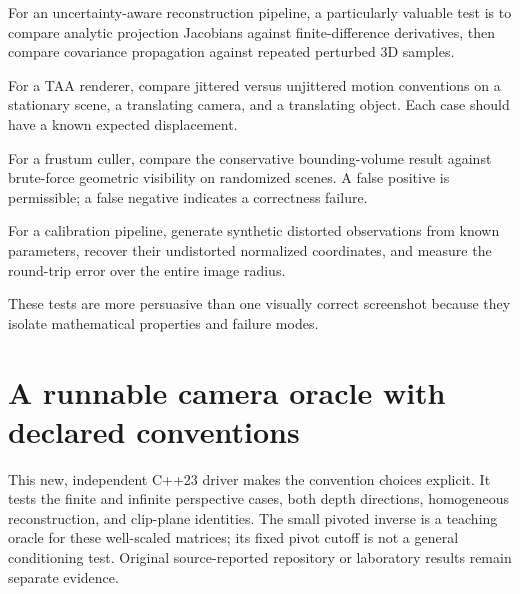 For an uncertainty-aware reconstruction pipeline, a particularly valuable test is to compare analytic projection Jacobians against finite-difference derivatives, then compare covariance propagation against repeated perturbed 3D samples.

For a TAA renderer, compare jittered versus unjittered motion conventions on a stationary scene, a translating camera, and a translating object. Each case should have a known expected displacement.

For a frustum culler, compare the conservative bounding-volume result against brute-force geometric visibility on randomized scenes. A false positive is permissible; a false negative indicates a correctness failure.

For a calibration pipeline, generate synthetic distorted observations from known parameters, recover their undistorted normalized coordinates, and measure the round-trip error over the entire image radius.

These tests are more persuasive than one visually correct screenshot because they isolate mathematical properties and failure modes.

\section{A runnable camera oracle with declared conventions}\label{02-foundations-ii-ch037-a-runnable-camera-oracle-with-declared-conventions}

\hypertarget{02-foundations-ii-ch037-a-runnable-camera-oracle-with-declared-conventions}{}

This new, independent C++23 driver makes the convention choices explicit. It tests the finite and infinite perspective cases, both depth directions, homogeneous reconstruction, and clip-plane identities. The small pivoted inverse is a teaching oracle for these well-scaled matrices; its fixed pivot cutoff is not a general conditioning test. Original source-reported repository or laboratory results remain separate evidence.

